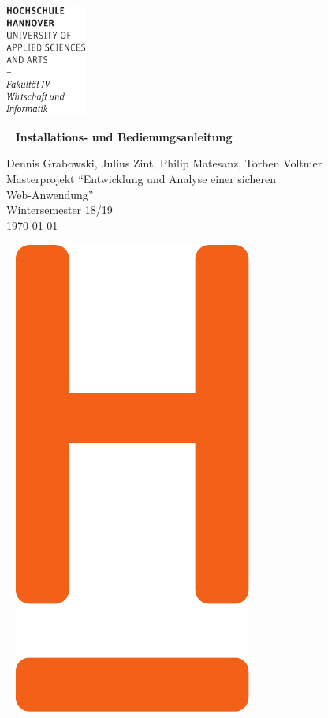 \documentclass[12pt,DIV14,BCOR10mm,a4paper,parskip=half-,headsepline,headinclude,english,ngerman,bibliography=totocnumbered]{scrreprt}
\begin{document}
  \thispagestyle{empty} %
\includegraphics[width=0.2\textwidth]{Wortmarke_WI_schwarz}

   {  ~ \sffamily
  \vfill
  {\Huge\bfseries Installations- und Bedienungsanleitung}
  \bigskip

  {\Large
  Dennis Grabowski, Julius Zint, Philip Matesanz, Torben Voltmer \\[2ex]
  Masterprojekt \enquote{Entwicklung und Analyse einer sicheren \\Web-Anwendung} \\
  Wintersemester 18/19
 \\[5ex]
   \today }
}
 \vfill

  ~ \hfill
  \includegraphics[height=0.3\paperheight]{H_WI_Pantone1665}
\end{document}
